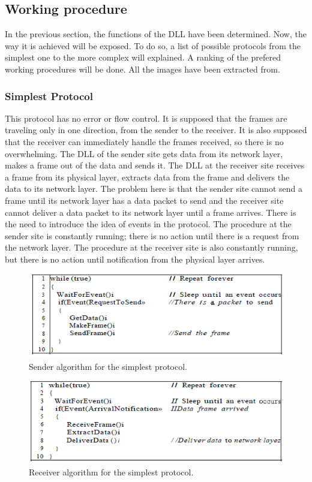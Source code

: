 \subsection{Working procedure}
In the previous section, the functions of the DLL have been determined. Now, the way it is achieved will be exposed. To do so, a list of possible protocols from the simplest one to the more complex will explained. A ranking of the prefered working procedures will be done. All the images have been extracted from\cite{Forouzan2012}.
\subsubsection{Simplest Protocol}
This protocol has no error or flow control. It is supposed that the frames are traveling only in one direction, from the sender to the receiver. It is also supposed that the receiver can immediately handle the frames received, so there is no overwhelming. The DLL of the sender site gets data from its network layer, makes a frame out of the data and sends it.
The DLL at the receiver site receives a frame from its physical layer, extracts data from the frame and delivers the data to its network layer. The problem here is that the sender site cannot send a frame until its network layer has a data packet to send and the receiver site cannot deliver a data packet to its network layer until a frame arrives. There is the need to introduce the idea of events in the protocol. The
procedure at the sender site is constantly running; there is no action until there is a request
from the network layer. The procedure at the receiver site is also constantly running, but
there is no action until notification from the physical layer arrives.
\begin{figure}[H]
\begin{center}
\includegraphics[scale=1]{simplestsender.PNG}
\caption{Sender algorithm for the simplest protocol.}
\end{center}
\end{figure}
\begin{figure}[H]
\begin{center}
\includegraphics[scale=1]{simplestreceiver.PNG}
\caption{Receiver algorithm for the simplest protocol.}
\end{center}
\end{figure}
